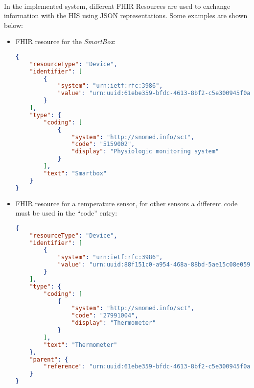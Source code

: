 \paragraph{} In the implemented system, different \acs{FHIR} Resources are used to exchange information with the \acs{HIS} using \acs{JSON} representations. Some examples are shown below:

\begin{itemize}
    \item \acs{FHIR} resource for the \textit{SmartBox}:
    \begin{lstlisting}[language=json]            
{ 
    "resourceType": "Device", 
    "identifier": [ 
        { 
            "system": "urn:ietf:rfc:3986", 
            "value": "urn:uuid:61ebe359-bfdc-4613-8bf2-c5e300945f0a"  
        } 
    ], 
    "type": { 
        "coding": [ 
            { 
                "system": "http://snomed.info/sct", 
                "code": "5159002", 
                "display": "Physiologic monitoring system" 
            } 
        ], 
        "text": "Smartbox" 
    } 
}
    \end{lstlisting} 

    \item \acs{FHIR} resource for a temperature sensor, for other sensors a different code must be used in the ``code'' entry:
    \begin{lstlisting}[language=json]            
{ 
    "resourceType": "Device", 
    "identifier": [ 
        { 
            "system": "urn:ietf:rfc:3986", 
            "value": "urn:uuid:88f151c0-a954-468a-88bd-5ae15c08e059"  
        } 
    ], 
    "type": { 
        "coding": [ 
            { 
                "system": "http://snomed.info/sct", 
                "code": "27991004", 
                "display": "Thermometer" 
            } 
        ], 
        "text": "Thermometer" 
    }, 
    "parent": { 
        "reference": "urn:uuid:61ebe359-bfdc-4613-8bf2-c5e300945f0a" 
    } 
}
    \end{lstlisting} 


\end{itemize}
